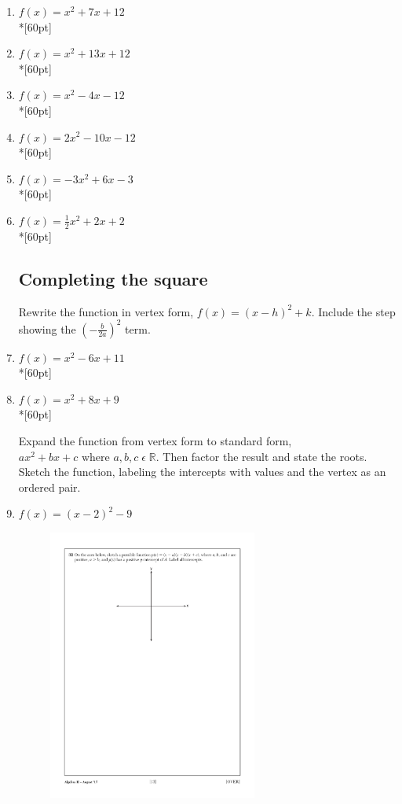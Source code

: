 \documentclass[]{book}
\begin{document}
\begin{enumerate}

\item   $f(x)=x^2+7x+12$\\*[60pt]
\item   $f(x)=x^2+13x+12$\\*[60pt]
\item   $f(x)=x^2-4x-12$\\*[60pt]
\item   $f(x)=2x^2-10x-12$\\*[60pt]
\item   $f(x)=-3x^2+6x-3$\\*[60pt]
\item   $f(x)=\frac{1}{2}x^2+2x+2$\\*[60pt]

\subsection*{Completing the square}

Rewrite the function in vertex form, $f(x)=(x-h)^2+k$. Include the step showing the $(-\frac{b}{2a})^2$ term.
\item   $f(x)=x^2-6x+11$\\*[60pt]
\item   $f(x)=x^2+8x+9$\\*[60pt]

Expand the function from vertex form to standard form, $ax^2+bx+c \text{ where } a, b, c \;  \epsilon \; \mathbb{R}$. Then factor the result and state the roots. Sketch the function, labeling the intercepts with values and the vertex as an ordered pair.
\item   $f(x)=(x-2)^2-9$
\begin{figure}[!ht]
    \flushright
    \includegraphics[width=0.65\textwidth]{simple-axes.pdf}
\end{figure}


\end{enumerate}
\end{document}
